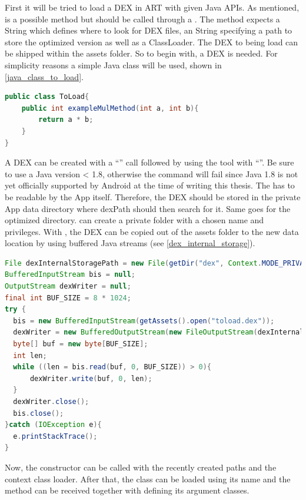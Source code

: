 First it will be tried to load a DEX in ART with given Java APIs.
As mentioned,  is a possible method but should be called
through a . The method expects a  String which defines where to look for DEX files, an  String specifying a path to store the optimized version as well as a  ClassLoader.
The DEX to being load can be shipped within the assets folder.
So to begin with, a DEX is needed. For simplicity reasons a simple Java class will be used, shown in \autoref{java_class_to_load}.
\begin{lstlisting}[language=Java, caption=Java Class to load, label=java_class_to_load]
public class ToLoad{
    public int exampleMulMethod(int a, int b){
        return a * b;
    }
}
\end{lstlisting}
A DEX can be created with a ``'' call followed by
using the  tool with ``''. Be sure to use a Java version < 1.8, otherwise the 
command will fail since Java 1.8 is not yet officially supported by Android at the time of writing this thesis.
The  has to be readable by the App itself. Therefore,
the DEX should be stored in the private App data directory where dexPath should then
search for it. Same goes for the optimized directory.
 can create a private folder with a chosen name
and privileges. With , the DEX can be
copied out of the assets folder to the new data location by using buffered Java streams (see \autoref{dex_internal_storage}).\newpage
\begin{lstlisting}[language=Java, caption=Dex Internal Storage, label=dex_internal_storage]
File dexInternalStoragePath = new File(getDir("dex", Context.MODE_PRIVATE), "toload.dex");
BufferedInputStream bis = null;
OutputStream dexWriter = null;
final int BUF_SIZE = 8 * 1024;
try {
  bis = new BufferedInputStream(getAssets().open("toload.dex"));
  dexWriter = new BufferedOutputStream(new FileOutputStream(dexInternalStoragePath));
  byte[] buf = new byte[BUF_SIZE];
  int len;
  while ((len = bis.read(buf, 0, BUF_SIZE)) > 0){
      dexWriter.write(buf, 0, len);
  }
  dexWriter.close();
  bis.close();
}catch (IOException e){
  e.printStackTrace();
}
\end{lstlisting}
Now, the  constructor can be called with the recently
created paths and the context class loader. After that, the class can be loaded
using its name and the method can be received together with defining its argument classes.
